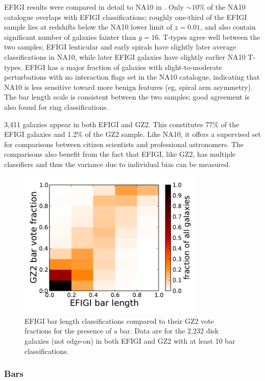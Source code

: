 \documentclass[useAMS,usenatbib]{mn2e}
\begin{document}
EFIGI results were compared in detail to NA10 in \citet{bai11}. Only $\sim10\%$ of the NA10 catalogue overlaps with EFIGI classifications; roughly one-third of the EFIGI sample lies at redshifts below the NA10 lower limit of $z=0.01$, and also contain significant number of galaxies fainter than $g=16$. T-types agree well between the two samples; EFIGI lenticular and early spirals have slightly later average classifications in NA10, while later EFIGI galaxies have slightly earlier NA10 T-types. EFIGI has a major fraction of galaxies with slight-to-moderate perturbations with no interaction flags set in the NA10 catalogue, indicating that NA10 is less sensitive toward more benign features (eg, spiral arm asymmetry). The bar length scale is consistent between the two samples; good agreement is also found for ring classifications. 

3,411 galaxies appear in both EFIGI and GZ2. This constitutes 77\% of the EFIGI galaxies and 1.2\% of the GZ2 sample. Like NA10, it offers a supervised set for comparisons between citizen scientists and professional astronomers. The comparisons also benefit from the fact that EFIGI, like GZ2, has multiple classifiers and thus the variance due to individual bias can be measured. 

\begin{figure}
\includegraphics[angle=0,width=3.5in]{figures/efigi_bars.pdf}
\caption{EFIGI bar length classifications compared to their GZ2 vote fractions for the presence of a bar. Data are for the 2,232 disk galaxies (not edge-on) in both EFIGI and GZ2 with at least 10 bar classifications. 
\label{fig-efigi_bars}}
\end{figure}

\subsubsection{Bars}
\end{document}
